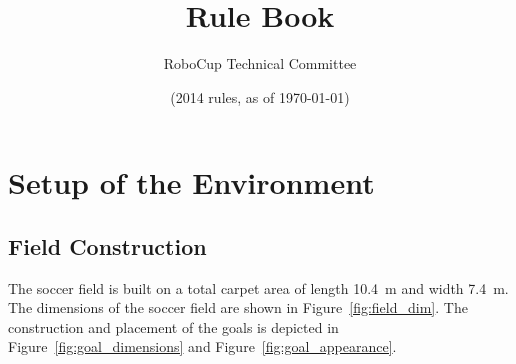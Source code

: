 \documentclass[12pt]{article}
\title{\leaguename Rule Book}
\author{RoboCup Technical Committee}
\date{(2014 rules, as of \today)}
\newcommand{\TotalWidth}{7.4~m\xspace}
\newcommand{\TotalLength}{10.4~m\xspace }
\begin{document}
\maketitle

\vfill

\tableofcontents
\setcounter{tocdepth}{3}

\thispagestyle{fancy}

\clearpage

\cfoot{\thepage}
\setcounter{page}{1}

\section{Setup of the Environment}

\subsection{Field Construction}
\label{sec:field_dim}

The soccer field is built on a total carpet area of length \TotalLength and width \TotalWidth. The dimensions of the soccer field are shown in Figure~\ref{fig:field_dim}. The construction and placement of the goals is depicted in Figure~\ref{fig:goal_dimensions} and Figure~\ref{fig:goal_appearance}.
\end{document}
